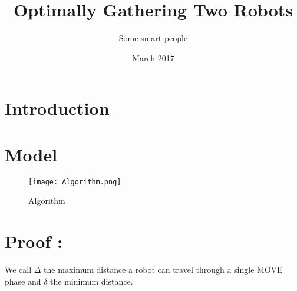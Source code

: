 \documentclass[11pt]{article}
\title{Optimally Gathering Two Robots}
\author{Some smart people}
\date{March 2017}
\begin{document}
\maketitle

\section{Introduction}

\section{Model}

\begin{figure}[htb]
	\centering
	\texttt{[image: Algorithm.png]}
	\caption{Algorithm}
\end{figure}

\section{Proof :}
We call $\Delta$ the maximum distance a robot can travel through a single MOVE phase and $\delta$ the minimum distance.
\end{document}
